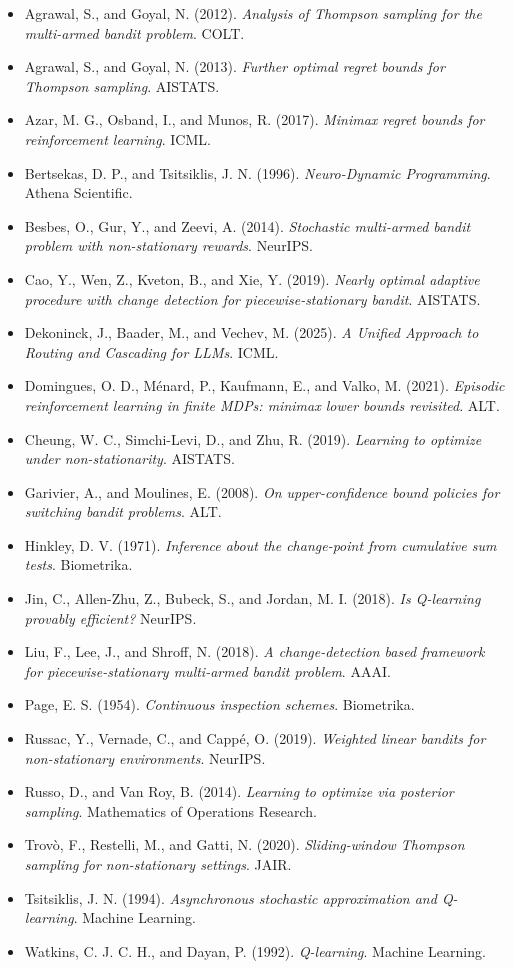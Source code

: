 \documentclass[11pt]{article}
\theoremstyle{definition}
\begin{document}
\begin{itemize}
    \item Agrawal, S., and Goyal, N. (2012). \emph{Analysis of Thompson sampling for the multi-armed bandit problem}. COLT.
    \item Agrawal, S., and Goyal, N. (2013). \emph{Further optimal regret bounds for Thompson sampling}. AISTATS.
    \item Azar, M. G., Osband, I., and Munos, R. (2017). \emph{Minimax regret bounds for reinforcement learning}. ICML.
    \item Bertsekas, D. P., and Tsitsiklis, J. N. (1996). \emph{Neuro-Dynamic Programming}. Athena Scientific.
    \item Besbes, O., Gur, Y., and Zeevi, A. (2014). \emph{Stochastic multi-armed bandit problem with non-stationary rewards}. NeurIPS.
    \item Cao, Y., Wen, Z., Kveton, B., and Xie, Y. (2019). \emph{Nearly optimal adaptive procedure with change detection for piecewise-stationary bandit}. AISTATS.
    \item Dekoninck, J., Baader, M., and Vechev, M. (2025). \emph{A Unified Approach to Routing and Cascading for LLMs}. ICML.
    \item Domingues, O. D., M\'enard, P., Kaufmann, E., and Valko, M. (2021). \emph{Episodic reinforcement learning in finite MDPs: minimax lower bounds revisited}. ALT.
    \item Cheung, W. C., Simchi-Levi, D., and Zhu, R. (2019). \emph{Learning to optimize under non-stationarity}. AISTATS.
    \item Garivier, A., and Moulines, E. (2008). \emph{On upper-confidence bound policies for switching bandit problems}. ALT.
    \item Hinkley, D. V. (1971). \emph{Inference about the change-point from cumulative sum tests}. Biometrika.
    \item Jin, C., Allen-Zhu, Z., Bubeck, S., and Jordan, M. I. (2018). \emph{Is Q-learning provably efficient?} NeurIPS.
    \item Liu, F., Lee, J., and Shroff, N. (2018). \emph{A change-detection based framework for piecewise-stationary multi-armed bandit problem}. AAAI.
    \item Page, E. S. (1954). \emph{Continuous inspection schemes}. Biometrika.
    \item Russac, Y., Vernade, C., and Cappé, O. (2019). \emph{Weighted linear bandits for non-stationary environments}. NeurIPS.
    \item Russo, D., and Van Roy, B. (2014). \emph{Learning to optimize via posterior sampling}. Mathematics of Operations Research.
    \item Trovò, F., Restelli, M., and Gatti, N. (2020). \emph{Sliding-window Thompson sampling for non-stationary settings}. JAIR.
    \item Tsitsiklis, J. N. (1994). \emph{Asynchronous stochastic approximation and Q-learning}. Machine Learning.
    \item Watkins, C. J. C. H., and Dayan, P. (1992). \emph{Q-learning}. Machine Learning.
\end{itemize}
\end{document}
